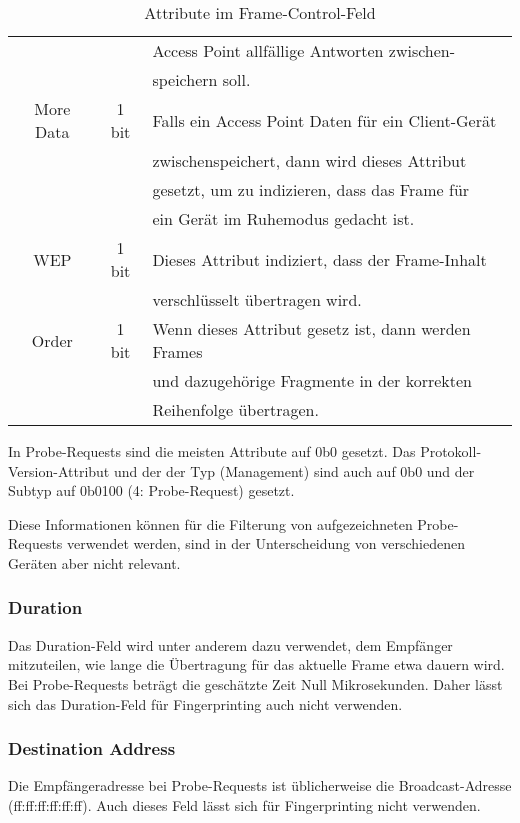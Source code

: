 \begin{table}[h!]
\begin{tabular}{|c|c|l|}
        && Access Point allfällige Antworten zwischen-\\
        && speichern soll. \\
        \hline
        More Data & 1 bit & 
        Falls ein Access Point Daten für ein Client-Gerät \\
        && zwischenspeichert, dann wird dieses Attribut \\
        && gesetzt, um zu indizieren, dass das Frame für \\
        && ein Gerät im Ruhemodus gedacht ist. \\
        \hline
        WEP & 1 bit & 
        Dieses Attribut indiziert, dass der Frame-Inhalt \\
        && verschlüsselt übertragen wird.\\
        \hline
        Order & 1 bit & 
        Wenn dieses Attribut gesetz ist, dann werden Frames \\
        && und dazugehörige Fragmente in der korrekten \\
        && Reihenfolge übertragen. \\
        \hline
    \end{tabular}
    \caption{Attribute im Frame-Control-Feld
    \label{table:framecontrolattributes}}  
\end{table}

In Probe-Requests sind die meisten Attribute auf 0b0 gesetzt.
Das Protokoll-Version-Attribut und der der Typ (Management) sind auch auf 
0b0 und der Subtyp auf 0b0100 (4: Probe-Request) gesetzt.

Diese Informationen können für die Filterung von aufgezeichneten Probe-Requests
verwendet werden, sind in der Unterscheidung von verschiedenen Geräten aber 
nicht relevant.

\subsubsection*{Duration}
Das Duration-Feld wird unter anderem dazu verwendet, dem Empfänger 
mitzuteilen, wie lange die Übertragung für das aktuelle Frame etwa 
dauern wird. Bei Probe-Requests beträgt die geschätzte Zeit Null Mikrosekunden.
Daher lässt sich das Duration-Feld für Fingerprinting auch nicht verwenden.

\subsubsection*{Destination Address}
Die Empfängeradresse bei Probe-Requests ist üblicherweise die Broadcast-Adresse 
(ff:ff:ff:ff:ff:ff). Auch dieses Feld lässt sich für Fingerprinting nicht 
verwenden.

